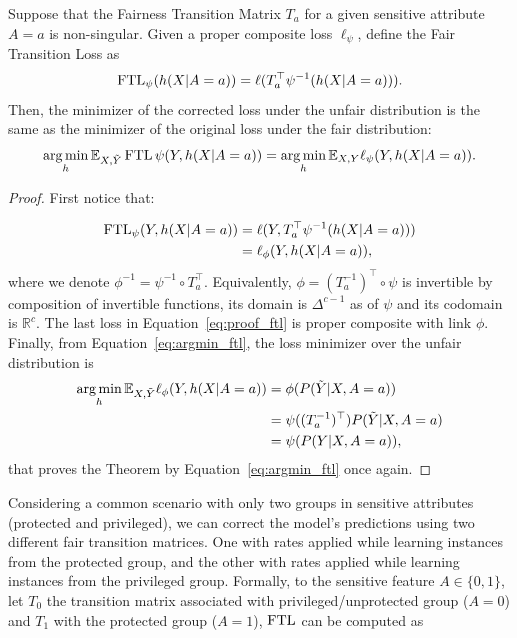 \begin{theorem}\label{theorem:ftl}
    Suppose that the Fairness Transition Matrix $T_a$ for a given sensitive attribute $A=a$ is non-singular. Given a proper composite loss $\ell_{\psi}$, define the Fair Transition Loss as
    \[\operatorname{FTL}_{\psi}(h(X|A=a)) = \ell(T^{\top}_a \psi^{-1}(h(X|A=a))).\]
    Then, the minimizer of the corrected loss under the unfair distribution is the same as the minimizer of the original loss under the fair distribution:
    \[  \operatorname*{arg\,min}\limits_{h}\mathbb{E}_{X,\tilde{Y}}\operatorname{FTL}{\psi}(Y, h(X|A=a)) = \operatorname*{arg\,min}\limits_{h}\mathbb{E}_{X,Y}\ell_{\psi}(Y, h(X|A=a)).\]
\end{theorem}
\begin{proof}
    First notice that:

    \begin{align} \label{eq:proof_ftl}
        \operatorname{FTL}_{\psi}(Y, h(X|A=a)) &= \ell(Y, T^{\top}_a \psi^{-1}(h(X|A=a))) \nonumber \\
        &= \ell_{\phi}(Y, h(X|A=a)),
    \end{align}
    where we denote $\phi^{-1} = \psi^{-1} \circ T_a^{\top}$. Equivalently, $\phi = (T_a^{-1})^{\top} \circ \psi$ is invertible by composition of invertible functions, its domain is $\Delta^{c-1}$ as of $\psi$ and its codomain is $\mathbb{R}^{c}$. The last loss in Equation~\ref{eq:proof_ftl} is proper composite with link $\phi$. Finally, from Equation~\ref{eq:argmin_ftl}, the loss minimizer over the unfair distribution is
    \begin{align}
        \operatorname*{arg\,min}\limits_{h}\mathbb{E}_{X,\tilde{Y}}\ell_{\phi}(Y, h(X|A=a)) &= \phi(P(\tilde{Y}|X,A=a)) \\
        &= \psi((T_a^{-1})^{\top}) P(\tilde{Y}|X,A=a) \\
        &= \psi(P(Y|X,A=a)),
    \end{align}
    that proves the Theorem by Equation~\ref{eq:argmin_ftl} once again.
\end{proof}

Considering a common scenario with only two groups in sensitive attributes (protected and privileged), we can correct the model's predictions using two different fair transition matrices. One with rates applied while learning instances from the protected group, and the other with rates applied while learning instances from the privileged group. Formally, to the sensitive feature $A \in \{0,1\}$, let $T_0$ the transition matrix associated with privileged/unprotected group ($A = 0$) and $T_1$ with the protected group ($A = 1$), $\operatorname{FTL}$ can be computed as

